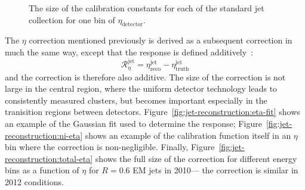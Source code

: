 

\begin{figure}
\centering
{}
\label{fig:jet-reconstruction:total_jes}
\caption{The size of the calibration constants for each of the standard jet collection for one bin of $\eta_\mathrm{detector}$.}
\end{figure}


The $\eta$ correction mentioned previously is derived as a subsequent correction in much the same way, except that the response is defined additively~\cite{JES2010}:
%
\begin{equation}
\mathcal{R}_\eta^\mathrm{jet} = \eta^{\mathrm{jet}}_{\mathrm{reco}} -  \eta^{\mathrm{jet}}_{\mathrm{truth}} 
\end{equation}
%
and the correction is therefore also additive. The size of the correction is not large in the central region, where the uniform detector technology leads to consistently measured clusters, but becomes important especially in the tranisition regions between detectors. Figure~\ref{fig:jet-reconstruction:eta-fit} shows an example of the Gaussian fit used to determine the response; Figure~\ref{fig:jet-reconstruction:ni-eta} shows an example of the calibration function itself in an $\eta$ bin where the correction is non-negligible. Finally, Figure~\ref{fig:jet-reconstruction:total-eta} shows the full size of the correction for different energy bins as a function of $\eta$ for $R=0.6$ EM jets in 2010--- the correction is similar in 2012 conditions.

